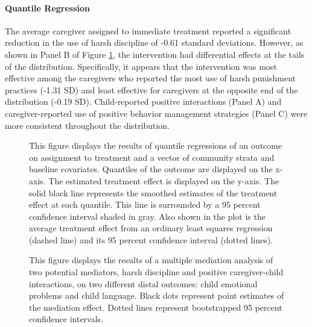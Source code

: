 \documentclass[12pt,authoryear]{elsarticle}\usepackage{knitr}
\begin{document}
\clearpage














\newpage
\paragraph*{Quantile Regression}

The average caregiver assigned to immediate treatment reported a significant reduction in the use of harsh discipline of -0.61 standard deviations. However, as shown in Panel B of Figure \ref{fig:quant}, the intervention had differential effects at the tails of the distribution. Specifically, it appears that the intervention was most effective among the caregivers who reported the most use of harsh punishment practices (-1.31 SD) and least effective for caregivers at the opposite end of the distribution (-0.19 SD). Child-reported positive interactions (Panel A) and caregiver-reported use of positive behavior management strategies (Panel C) were more consistent throughout the distribution.

\begin{figure}
  \centerline{}
  \caption{This figure displays the results of quantile regressions of an outcome on assignment to treatment and a vector of community strata and baseline covariates. Quantiles of the outcome are displayed on the x-axis. The estimated treatment effect is displayed on the y-axis. The solid black line represents the smoothed estimates of the treatment effect at each quantile. This line is surrounded by a 95 percent confidence interval shaded in gray. Also shown in the plot is the average treatment effect from an ordinary least squares regression (dashed line) and its 95 percent confidence interval (dotted lines).}
  \label{fig:quant}
\end{figure}

\newpage
\begin{figure}
  \centerline{}
  \caption{This figure displays the results of a multiple mediation analysis of two potential mediators, harsh discipline and positive caregiver-child interactions, on two different distal outcomes: child emotional problems and child language. Black dots represent point estimates of the mediation effect. Dotted lines represent bootstrapped 95 percent confidence intervals.}
  \label{fig:med}
\end{figure}
\end{document}
